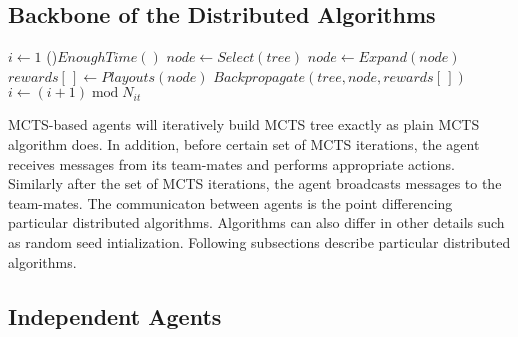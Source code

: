 \subsection{Backbone of the Distributed Algorithms}
\label{sec_dmcts_common}

\begin{algorithm}
\DontPrintSemicolon
\caption{$DistributedMCTSLoop(tree)$\label{alg_dmcts_common}}
$i \leftarrow 1$\;
\While(){$EnoughTime()$}{
    $node \leftarrow Select(tree)$ \;
    $node \leftarrow Expand(node)$ \;
    $rewards[\,] \leftarrow Playouts(node)$ \;
    $Backpropagate(tree,node,rewards[\,])$ \;
    $i \leftarrow (i + 1)\;\mathrm{mod}\;N_{it}$\;
}
 \;
\end{algorithm}

MCTS-based agents will iteratively build MCTS tree exactly as plain MCTS algorithm does. In
addition, before certain set of MCTS iterations, the agent receives messages from its team-mates
and performs appropriate actions. Similarly after the set of MCTS iterations, the agent
broadcasts messages to the team-mates. The communicaton between agents is the point differencing
particular distributed algorithms. Algorithms can also differ in other details such as random
seed intialization. Following subsections describe particular distributed algorithms.


\subsection{Independent Agents}

